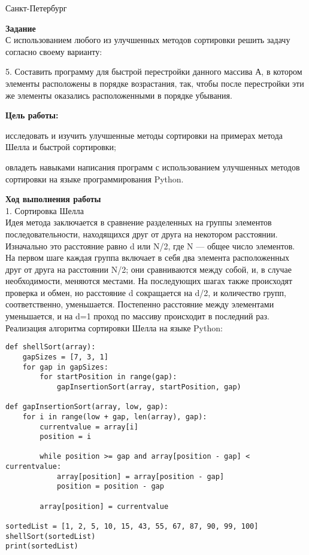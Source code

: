 \documentclass[12pt]{article}
\begin{document}
\par\bigskip\par\bigskip\par\bigskip\par\bigskip\par\bigskip\par\bigskip\par\bigskip\par\bigskip
\begin{center}
Санкт-Петербург
\par{}
\end{center}
\pagebreak
\textbf{Задание} \\

С использованием любого из улучшенных методов сортировки решить задачу согласно
своему варианту:

5. Составить программу для быстрой перестройки данного массива А, в котором элементы
расположены в порядке возрастания, так, чтобы после перестройки эти же элементы
оказались расположенными в порядке убывания. \\
\par
\textbf{ Цель работы:}
\begin{list}{-}{}
\item исследовать и изучить улучшенные методы сортировки на примерах метода Шелла и
быстрой сортировки;
\item овладеть навыками написания программ с использованием улучшенных методов
сортировки на языке программирования Python.
\end{list}


\par
\textbf{Ход выполнения работы}\\
1. Сортировка Шелла\\
Идея метода заключается в сравнение разделенных на группы элементов последовательности, находящихся друг от друга на некотором расстоянии. Изначально это расстояние равно d или N/2, где N — общее число элементов. На первом шаге каждая группа включает в себя два элемента расположенных друг от друга на расстоянии N/2; они сравниваются между собой, и, в случае необходимости, меняются местами. На последующих шагах также происходят проверка и обмен, но расстояние d сокращается на d/2, и количество групп, соответственно, уменьшается. Постепенно расстояние между элементами уменьшается, и на d=1 проход по массиву происходит в последний раз.
Реализация алгоритма сортировки Шелла на языке Python:
\begin{verbatim}
def shellSort(array):
	gapSizes = [7, 3, 1]
	for gap in gapSizes:
		for startPosition in range(gap):
			gapInsertionSort(array, startPosition, gap)

def gapInsertionSort(array, low, gap):
	for i in range(low + gap, len(array), gap):
		currentvalue = array[i]
		position = i

		while position >= gap and array[position - gap] < currentvalue:
			array[position] = array[position - gap]
			position = position - gap

		array[position] = currentvalue

sortedList = [1, 2, 5, 10, 15, 43, 55, 67, 87, 90, 99, 100]
shellSort(sortedList)
print(sortedList)
\end{verbatim}
\end{document}
